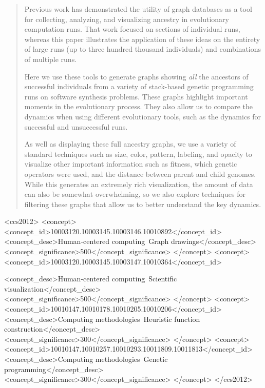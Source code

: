 \documentclass{sig-alternate}
\begin{document}
\begin{abstract}

Previous work has demonstrated the utility of graph databases as a tool 
for collecting, analyzing, and visualizing ancestry in evolutionary computation runs. 
That work focused on sections of individual runs, whereas this paper 
illustrates the application of these ideas on the entirety of large runs 
(up to three hundred thousand individuals) and combinations of multiple runs.

Here we use these tools to generate graphs showing \emph{all} the 
ancestors of successful individuals from a variety of stack-based 
genetic programming runs on software synthesis problems. These graphs 
highlight important moments in the evolutionary process. They also 
allow us to compare the dynamics when using different evolutionary tools, 
such as the dynamics for successful and unsuccessful runs.

As well as displaying these full ancestry graphs, we use a
variety of standard techniques such as size, color, pattern,
labeling, and opacity to visualize other important information such as fitness, 
which genetic operators were used, and the distance between parent and
child genomes. While this generates an extremely rich visualization,
the amount of data can also be somewhat overwhelming, so we also
explore techniques for filtering these graphs that allow us to better
understand the key dynamics.

\end{abstract}

\begin{CCSXML}
	<ccs2012>
	<concept>
	<concept_id>10003120.10003145.10003146.10010892</concept_id>
	<concept_desc>Human-centered computing~Graph drawings</concept_desc>
	<concept_significance>500</concept_significance>
	</concept>
	<concept>
	<concept_id>10003120.10003145.10003147.10010364</concept_id>

	<concept_desc>Human-centered computing~Scientific visualization</concept_desc>
	<concept_significance>500</concept_significance>
	</concept>
	<concept>
	<concept_id>10010147.10010178.10010205.10010206</concept_id>
	<concept_desc>Computing methodologies~Heuristic function construction</concept_desc>
	<concept_significance>300</concept_significance>
	</concept>
	<concept>
	<concept_id>10010147.10010257.10010293.10011809.10011813</concept_id>
	<concept_desc>Computing methodologies~Genetic programming</concept_desc>
	<concept_significance>300</concept_significance>
	</concept>
	</ccs2012>
\end{CCSXML}
\end{document}
